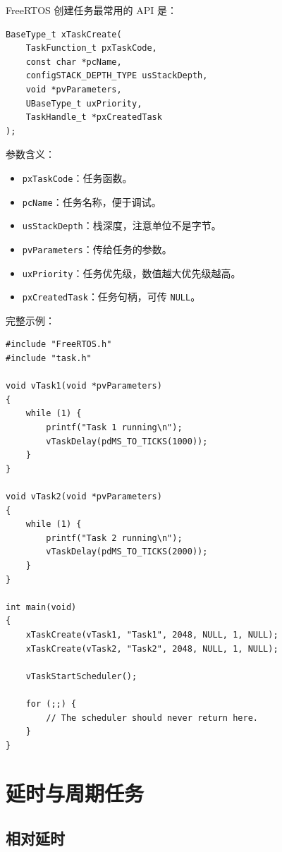 \documentclass[12pt,a4paper]{ctexart}
\begin{document}
FreeRTOS 创建任务最常用的 API 是：

\begin{lstlisting}
BaseType_t xTaskCreate(
    TaskFunction_t pxTaskCode,
    const char *pcName,
    configSTACK_DEPTH_TYPE usStackDepth,
    void *pvParameters,
    UBaseType_t uxPriority,
    TaskHandle_t *pxCreatedTask
);
\end{lstlisting}

参数含义：

\begin{itemize}
    \item \texttt{pxTaskCode}：任务函数。
    \item \texttt{pcName}：任务名称，便于调试。
    \item \texttt{usStackDepth}：栈深度，注意单位不是字节。
    \item \texttt{pvParameters}：传给任务的参数。
    \item \texttt{uxPriority}：任务优先级，数值越大优先级越高。
    \item \texttt{pxCreatedTask}：任务句柄，可传 \texttt{NULL}。
\end{itemize}

完整示例：

\begin{lstlisting}
#include "FreeRTOS.h"
#include "task.h"

void vTask1(void *pvParameters)
{
    while (1) {
        printf("Task 1 running\n");
        vTaskDelay(pdMS_TO_TICKS(1000));
    }
}

void vTask2(void *pvParameters)
{
    while (1) {
        printf("Task 2 running\n");
        vTaskDelay(pdMS_TO_TICKS(2000));
    }
}

int main(void)
{
    xTaskCreate(vTask1, "Task1", 2048, NULL, 1, NULL);
    xTaskCreate(vTask2, "Task2", 2048, NULL, 1, NULL);

    vTaskStartScheduler();

    for (;;) {
        // The scheduler should never return here.
    }
}
\end{lstlisting}

\section{延时与周期任务}

\subsection{相对延时}
\end{document}
